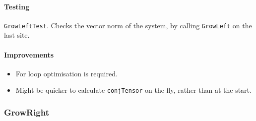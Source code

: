  \paragraph{Testing} \lstinline$GrowLeftTest$. Checks the vector norm of the system, by calling \lstinline$GrowLeft$ on the last site.
 \paragraph{Improvements}
 \begin{itemize}
 \item For loop optimisation is required.
 \item Might be quicker to calculate \lstinline$conjTensor$ on the fly, rather than at the start.
 \end{itemize}
 
 \subsubsection{GrowRight}
